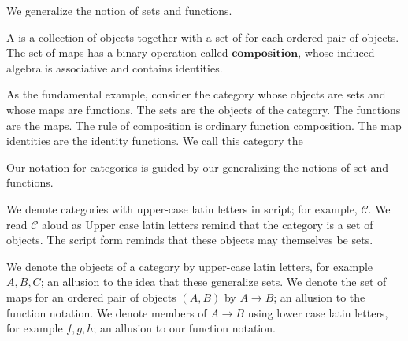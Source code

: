 
\sbasic



\sstart



We generalize the notion of sets and functions.


A  is a collection of objects together with a set of  for each ordered pair of objects.
The set of maps has a binary operation called $\textbf{composition}$, whose induced algebra is associative and contains identities.

As the fundamental example, consider the category whose objects are sets and whose maps are functions.
The sets are the objects of the category.
The functions are the maps.
The rule of composition is ordinary function composition.
The map identities are the identity functions.
We call this category the 


Our notation for categories is guided by our generalizing the notions of set and functions.

We denote categories with upper-case latin letters in script; for example, $\mathcal{C}$.
We read $\mathcal{C}$ aloud as 
Upper case latin letters remind that the category is a set of objects.
The script form reminds that these objects may themselves be sets.

We denote the objects of a category by upper-case latin letters,
for example $A, B, C$; an allusion to the idea that these generalize sets.
We denote the set of maps for an ordered pair of objects $(A, B)$
by $A \to B$; an allusion to the function notation.
We denote members of $A \to B$  using lower case latin letters,
for example $f, g, h$; an allusion to our function notation.

\strats
